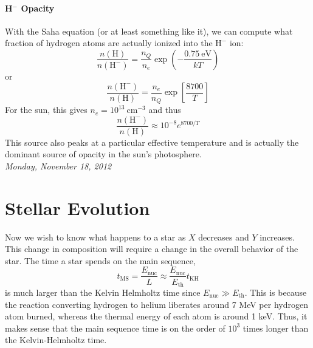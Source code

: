 \documentclass[10pt]{article}
\numberwithin{equation}{section}
\newcommand{\n}{\noindent}
\begin{document}
    \paragraph{H${}^-$ Opacity}
    \label{par:mathrmh--opacity}
    With the Saha equation (or at least something like it), we can compute what fraction of
    hydrogen atoms are actually ionized into the $\mathrm{H}^-$ ion:
    \begin{equation}
      \label{eq:222}
      \frac{n(\mathrm{H})}{n(\mathrm{H}^-)}=\frac{n_Q}{n_e}\exp\left(-\frac
{0.75\ \mathrm{eV}}{kT}\right)
    \end{equation}
    or
    \begin{equation}
      \label{eq:223}
      \frac{n(\mathrm{H^-})}{n(\mathrm{H})}=\frac{n_e}{n_Q}\exp\left[\frac
{8700}{T}\right]
    \end{equation}
    For the sun, this gives $n_e=10^{13}\ \mathrm{cm^{-3}}$ and thus
    \begin{equation}
      \label{eq:224}
      \frac{n(\mathrm{H}^-)}{n(\mathrm{H})}\approx 10^{-8}e^{8700/T}
    \end{equation}
    This source also peaks at a particular effective temperature and
    is actually the dominant source of opacity in the sun's
    photosphere.\\

    \n \textit{Monday, November 18, 2012}

    \section{Stellar Evolution}
    
    Now we wish to know what happens to a star as $X$ decreases and
    $Y$ increases.  This change in composition will require a change
    in the overall behavior of the star. The time a star spends on the
    main sequence,
    \begin{equation}
      \label{eq:226}
      t_{\mathrm{MS}}=\frac{E_{\mathrm{nuc}}}{L} \approx
      \frac{E_{\mathrm{nuc}}}{E_{\mathrm{th}}} t_{\mathrm{KH}}
    \end{equation}
    is much larger than the Kelvin Helmholtz time since
    $E_{\mathrm{nuc}}\gg E_{\mathrm{th}}$. This is because the
    reaction converting hydrogen to helium liberates around 7 MeV per
    hydrogen atom burned, whereas the thermal energy of each atom is
    around 1 keV. Thus, it makes sense that the main sequence time is
    on the order of $10^3$ times longer than the Kelvin-Helmholtz
    time.\\
\end{document}
